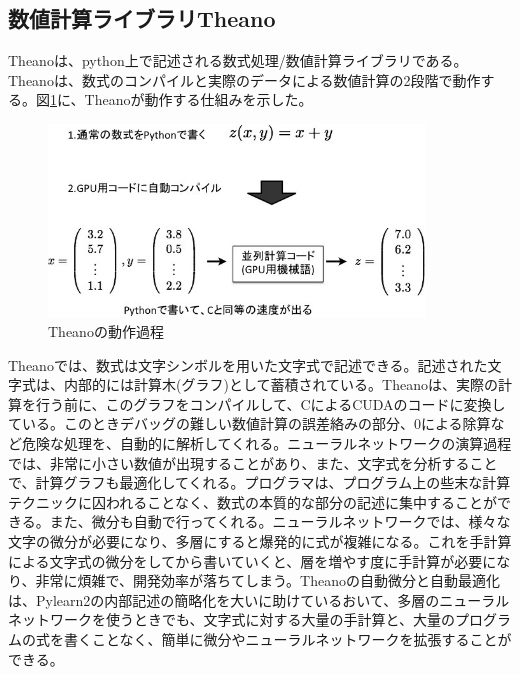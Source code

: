 \subsection{数値計算ライブラリTheano}
Theanoは、python上で記述される数式処理/数値計算ライブラリである。Theanoは、数式のコンパイルと実際のデータによる数値計算の2段階で動作する\cite{bergstra+al:2010-Scipy}。図\ref{c4_Theano_compile}に、Theanoが動作する仕組みを示した。
\begin{figure}[tbp]
 \centering
  \includegraphics[width=100mm]{img/c4/theano_compile}
 \caption{Theanoの動作過程}
 \label{c4_Theano_compile}
\end{figure}
Theanoでは、数式は文字シンボルを用いた文字式で記述できる。記述された文字式は、内部的には計算木(グラフ)として蓄積されている。Theanoは、実際の計算を行う前に、このグラフをコンパイルして、CによるCUDAのコードに変換している。このときデバッグの難しい数値計算の誤差絡みの部分、0による除算など危険な処理を、自動的に解析してくれる。ニューラルネットワークの演算過程では、非常に小さい数値が出現することがあり、また、文字式を分析することで、計算グラフも最適化してくれる。プログラマは、プログラム上の些末な計算テクニックに囚われることなく、数式の本質的な部分の記述に集中することができる。また、微分も自動で行ってくれる。ニューラルネットワークでは、様々な文字の微分が必要になり、多層にすると爆発的に式が複雑になる。これを手計算による文字式の微分をしてから書いていくと、層を増やす度に手計算が必要になり、非常に煩雑で、開発効率が落ちてしまう。Theanoの自動微分と自動最適化は、Pylearn2の内部記述の簡略化を大いに助けているおいて、多層のニューラルネットワークを使うときでも、文字式に対する大量の手計算と、大量のプログラムの式を書くことなく、簡単に微分やニューラルネットワークを拡張することができる。
